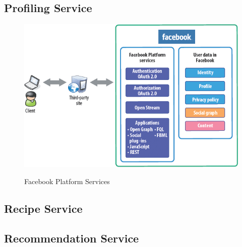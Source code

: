 \subsection{Profiling Service}
	\begin{figure}[h]
		\centering
		\includegraphics[width=1\linewidth]{figures/ch4_facebook_connect.png}
		\caption{Facebook Platform Services}
		\label{fig:ch4_facebook_connect}
		\cite{ko2010social}
	\end{figure}

\subsection{Recipe Service}
\subsection{Recommendation Service}
